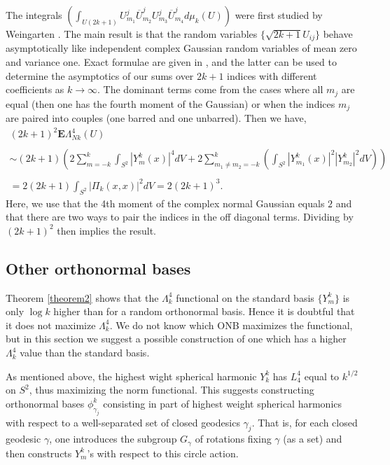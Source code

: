 \documentclass[10pt]{amsart}
\begin{document}
The integrals $\left(\int_{U(2k + 1)} U^j_{m_1}
\overline{U}^j_{m_2} U^j_{m_3} \overline{U}^j_{m_4} d\mu_k(U)
\right)$ were first  studied by Weingarten  \cite{W}. The main
result is that the random variables $\{\sqrt{2k + 1} U_{i j}\}$
behave asymptotically like independent complex Gaussian random
variables of mean zero and variance one. Exact formulae are given
in \cite{CS}, and the latter can be used to determine the
asymptotics of our sums over $2k + 1$ indices with different
coefficients as $k \to \infty$. The dominant terms come from the
cases where all $m_j$ are equal (then one has the fourth moment of
the Gaussian) or when the indices $m_j$ are paired into couples
(one barred and one unbarred). Then we have,
\begin{equation}\label{AUb} \begin{array}{l}(2k + 1)^2 {{\mathbf E}} \Lambda_{Nk}^4(U) \\ \\  \sim  (2 k+ 1)\left( 2 \sum_{m
= -k}^k \int_{S^2} |Y^k_{m}(x)|^4 dV  + 2 \sum_{m_1 \not= m_2 = -
k}^k \left(\int_{S^2} |Y^k_{m_1}(x)|^2 |Y_{m_2}^k|^2 dV \right) \right) \\  \\
= 2 (2k + 1) \int_{S^2} |{\varPi}_k(x,x)|^2 dV = 2 (2k + 1)^3.
\end{array}
\end{equation}
Here, we use that the 4th moment of the complex normal Gaussian
equals $2$ and that there are two ways to pair the indices in the
off diagonal terms. Dividing by $(2k + 1)^2$ then implies the
result.

\subsection{Other orthonormal bases}

Theorem \ref{theorem2} shows that the $\Lambda_k^4$ functional on
the standard basis $\{Y^k_m\}$ is only $\log k$ higher than for a
random orthonormal basis.  Hence it is doubtful that it does not
maximize $\Lambda_k^4$. We do not know which ONB maximizes the
functional, but in this section we suggest a possible construction
of one which has a higher $\Lambda_k^4$ value than the standard
basis.

As mentioned above,  the highest wight spherical harmonic $Y^k_k $
has $L_4^4$ equal to $k^{1/2}$ on $S^2$, thus maximizing  the norm
functional. This suggests constructing orthonormal bases
$\phi^k_{\gamma_j}$ consisting in part  of highest weight
spherical harmonics with respect to a well-separated set of closed
geodesics $\gamma_j$. That is, for each closed geodesic $\gamma$,
one introduces the subgroup $G_{\gamma}$ of rotations fixing
$\gamma$ (as a set) and then constructs $Y^k_m$'s with respect to
this circle action.
\end{document}
